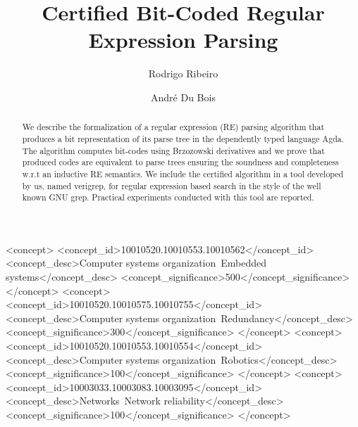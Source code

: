 \documentclass[sigconf]{acmart}
\def\resethooks{%
  \global\let\SaveRestoreHook\empty
  \global\let\ColumnHook\empty}
\let\hspre\empty
\let\hspost\empty
\theoremstyle{definition}
\newcommand{\V}[1]{\purple{\mathit{#1}}}
\begin{document}
\title{Certified Bit-Coded Regular Expression Parsing}

\author{Rodrigo Ribeiro}

\author{André Du Bois}

\begin{abstract}
We describe the formalization of a regular expression (RE) parsing
algorithm that produces a bit representation of its parse tree
in the dependently typed language Agda. The algorithm computes
bit-codes using Brzozowski derivatives and we prove that 
produced codes are equivalent to parse trees ensuring the 
soundness and completeness w.r.t an inductive RE semantics.
We include the certified algorithm in a tool developed by us, 
named verigrep, for regular expression based search in the style 
of the well known GNU grep. Practical experiments conducted with this tool 
are reported.
\end{abstract}
%
%
\begin{CCSXML}\begin{hscode}\SaveRestoreHook
\column{B}{@{}>{\hspre}l<{\hspost}@{}}%
\column{E}{@{}>{\hspre}l<{\hspost}@{}}%
\>[B]{}\V{ccs2012>}{}\<[E]%
\ColumnHook
\end{hscode}\resethooks
 <concept>
  <concept_id>10010520.10010553.10010562</concept_id>
  <concept_desc>Computer systems organization~Embedded systems</concept_desc>
  <concept_significance>500</concept_significance>
 </concept>
 <concept>
  <concept_id>10010520.10010575.10010755</concept_id>
  <concept_desc>Computer systems organization~Redundancy</concept_desc>
  <concept_significance>300</concept_significance>
 </concept>
 <concept>
  <concept_id>10010520.10010553.10010554</concept_id>
  <concept_desc>Computer systems organization~Robotics</concept_desc>
  <concept_significance>100</concept_significance>
 </concept>
 <concept>
  <concept_id>10003033.10003083.10003095</concept_id>
  <concept_desc>Networks~Network reliability</concept_desc>
  <concept_significance>100</concept_significance>
 </concept>\begin{hscode}\SaveRestoreHook
\column{B}{@{}>{\hspre}l<{\hspost}@{}}%
\column{E}{@{}>{\hspre}l<{\hspost}@{}}%
\>[B]{}\V{/ccs2012>}{}\<[E]%
\ColumnHook
\end{hscode}\resethooks
\end{CCSXML}
\end{document}
